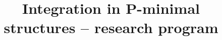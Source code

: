 \documentclass[11pt]{amsart}
\theoremstyle{definition}
\theoremstyle{remark}
\newtheorem{remark - ques}[subsubsection]{Remark/Quesion}
\theoremstyle{plain}
\numberwithin{equation}{subsection}
\begin{document}
\setcounter{tocdepth}{1} %


\title%
{Integration in P-minimal structures -- research program  }

\begin{abstract}
\end{abstract}


\maketitle







\appendix




\end{document}
